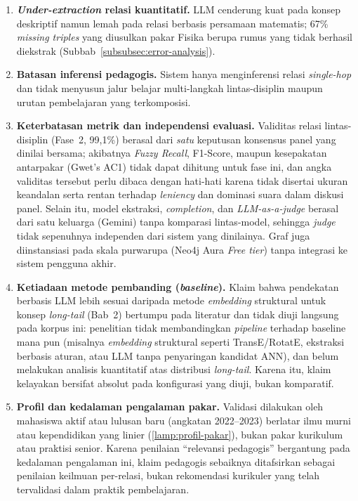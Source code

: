\documentclass[../../thesis]{subfiles}
\begin{document}
\begin{enumerate}
  \item \textbf{\textit{Under-extraction} relasi kuantitatif.} LLM cenderung kuat
        pada konsep deskriptif namun lemah pada relasi berbasis persamaan
        matematis; 67\% \textit{missing triples} yang diusulkan pakar Fisika
        berupa rumus yang tidak berhasil diekstrak
        (Subbab~\ref{subsubsec:error-analysis}).

  \item \textbf{Batasan inferensi pedagogis.} Sistem hanya menginferensi relasi
        \textit{single-hop} dan tidak menyusun jalur belajar multi-langkah
        lintas-disiplin maupun urutan pembelajaran yang terkomposisi.

  \item \textbf{Keterbatasan metrik dan independensi evaluasi.} Validitas relasi
        lintas-disiplin (Fase~2, 99{,}1\%) berasal dari \emph{satu} keputusan
        konsensus panel yang dinilai bersama; akibatnya \textit{Fuzzy Recall},
        F1-Score, maupun kesepakatan antarpakar (Gwet's AC1) tidak dapat dihitung
        untuk fase ini, dan angka validitas tersebut perlu dibaca dengan
        hati-hati karena tidak disertai ukuran keandalan serta rentan terhadap
        \textit{leniency} dan dominasi suara dalam diskusi panel. Selain itu,
        model ekstraksi, \textit{completion}, dan \textit{LLM-as-a-judge} berasal
        dari satu keluarga (Gemini) tanpa komparasi lintas-model, sehingga
        \textit{judge} tidak sepenuhnya independen dari sistem yang dinilainya.
        Graf juga diinstansiasi pada skala purwarupa (Neo4j Aura \textit{Free
        tier}) tanpa integrasi ke sistem pengguna akhir.

  \item \textbf{Ketiadaan metode pembanding (\textit{baseline}).} Klaim bahwa pendekatan berbasis
        LLM lebih sesuai daripada metode \textit{embedding} struktural untuk
        konsep \textit{long-tail} (Bab~2) bertumpu pada literatur dan tidak diuji
        langsung pada korpus ini: penelitian tidak membandingkan
        \textit{pipeline} terhadap baseline mana pun (misalnya \textit{embedding}
        struktural seperti TransE/RotatE, ekstraksi berbasis aturan, atau LLM
        tanpa penyaringan kandidat ANN), dan belum melakukan analisis kuantitatif
        atas distribusi \textit{long-tail}. Karena itu, klaim kelayakan bersifat
        absolut pada konfigurasi yang diuji, bukan komparatif.

  \item \textbf{Profil dan kedalaman pengalaman pakar.} Validasi dilakukan oleh
        mahasiswa aktif atau lulusan baru (angkatan 2022--2023) berlatar ilmu
        murni atau kependidikan yang linier (\ref{lamp:profil-pakar}), bukan
        pakar kurikulum atau praktisi senior. Karena penilaian ``relevansi
        pedagogis'' bergantung pada kedalaman pengalaman ini, klaim pedagogis
        sebaiknya ditafsirkan sebagai penilaian keilmuan per-relasi, bukan
        rekomendasi kurikuler yang telah tervalidasi dalam praktik pembelajaran.


\end{enumerate}
\end{document}
